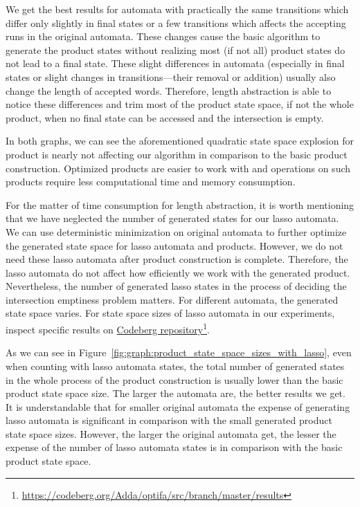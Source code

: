 We get the best results for automata with practically the same transitions which differ only slightly in final states or a few transitions which affects the accepting runs in the original automata. These changes cause the basic algorithm to generate the product states without realizing most (if not all) product states do not lead to a final state. These slight differences in automata (especially in final states or slight changes in transitions---their removal or addition) usually also change the length of accepted words. Therefore, length abstraction is able to notice these differences and trim most of the product state space, if not the whole product, when no final state can be accessed and the intersection is empty.

In both graphs, we can see the aforementioned quadratic state space explosion for product is nearly not affecting our algorithm in comparison to the basic product construction. Optimized products are easier to work with and operations on such products require less computational time and memory consumption.

For the matter of time consumption for length abstraction, it is worth mentioning that we have neglected the number of generated states for our lasso automata. We can use deterministic minimization on original automata to further optimize the generated state space for lasso automata and products. However, we do not need these lasso automata after product construction is complete. Therefore, the lasso automata do not affect how efficiently we work with the generated product. Nevertheless, the number of generated lasso states in the process of deciding the intersection emptiness problem matters. For different automata, the generated state space varies. For state space sizes of lasso automata in our experiments, inspect specific results on \href{https://codeberg.org/Adda/optifa/src/branch/master/results}{Codeberg repository}\footnote{\url{https://codeberg.org/Adda/optifa/src/branch/master/results}}.

As we can see in Figure~\ref{fig:graph:product_state_space_sizes_with_lasso}, even when counting with lasso automata states, the total number of generated states in the whole process of the product construction is usually lower than the basic product state space size. The larger the automata are, the better results we get. It is understandable that for smaller original automata the expense of generating lasso automata is significant in comparison with the small generated product state space sizes. However, the larger the original automata get, the lesser the expense of the number of lasso automata states is in comparison with the basic product state space.


